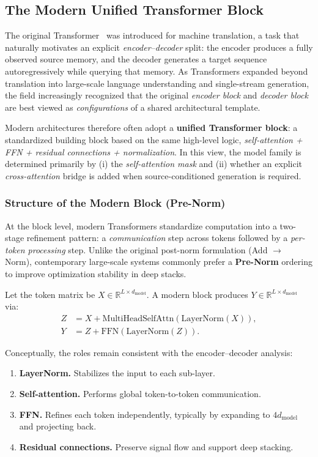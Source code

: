 \subsection{The Modern Unified Transformer Block}
\label{subsec:chapter17_modern_transformer_block}

\noindent
The original Transformer~\cite{vaswani2017_attention} was introduced for machine translation,
a task that naturally motivates an explicit \emph{encoder--decoder} split:
the encoder produces a fully observed source memory,
and the decoder generates a target sequence autoregressively while querying that memory.
As Transformers expanded beyond translation into large-scale language understanding
and single-stream generation,
the field increasingly recognized that the original \emph{encoder block} and \emph{decoder block}
are best viewed as \emph{configurations} of a shared architectural template.

\noindent
Modern architectures therefore often adopt a \textbf{unified Transformer block}:
a standardized building block based on the same high-level logic,
\emph{self-attention + FFN + residual connections + normalization}.
In this view, the model family is determined primarily by
(i) the \emph{self-attention mask}
and
(ii) whether an explicit \emph{cross-attention} bridge is added when source-conditioned generation is required.

\subsubsection{Structure of the Modern Block (Pre-Norm)}
\noindent
At the block level, modern Transformers standardize computation into a two-stage refinement pattern:
a \emph{communication} step across tokens followed by a \emph{per-token processing} step.
Unlike the original post-norm formulation (Add $\rightarrow$ Norm),
contemporary large-scale systems commonly prefer a \textbf{Pre-Norm} ordering
to improve optimization stability in deep stacks.

\noindent
Let the token matrix be
\(
X \in \mathbb{R}^{L \times d_{\text{model}}}.
\)
A modern block produces
\(
Y \in \mathbb{R}^{L \times d_{\text{model}}}
\)
via:
\begin{align}
	Z &= X + \text{MultiHeadSelfAttn}(\text{LayerNorm}(X)), \\
	Y &= Z + \text{FFN}(\text{LayerNorm}(Z)).
\end{align}

\noindent
Conceptually, the roles remain consistent with the encoder--decoder analysis:
\begin{enumerate}
	\item \textbf{LayerNorm.}
	Stabilizes the input to each sub-layer.
	\item \textbf{Self-attention.}
	Performs global token-to-token communication.
	\item \textbf{FFN.}
	Refines each token independently, typically by expanding to \(4d_{\text{model}}\) and projecting back.
	\item \textbf{Residual connections.}
	Preserve signal flow and support deep stacking.
\end{enumerate}

